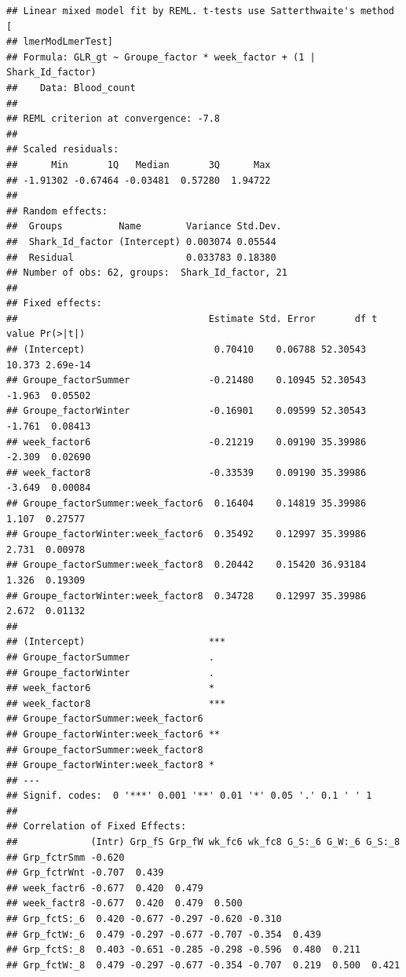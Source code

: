 \documentclass[
]{article}
\begin{document}
\begin{verbatim}
## Linear mixed model fit by REML. t-tests use Satterthwaite's method [
## lmerModLmerTest]
## Formula: GLR_gt ~ Groupe_factor * week_factor + (1 | Shark_Id_factor)
##    Data: Blood_count
## 
## REML criterion at convergence: -7.8
## 
## Scaled residuals: 
##      Min       1Q   Median       3Q      Max 
## -1.91302 -0.67464 -0.03481  0.57280  1.94722 
## 
## Random effects:
##  Groups          Name        Variance Std.Dev.
##  Shark_Id_factor (Intercept) 0.003074 0.05544 
##  Residual                    0.033783 0.18380 
## Number of obs: 62, groups:  Shark_Id_factor, 21
## 
## Fixed effects:
##                                  Estimate Std. Error       df t value Pr(>|t|)
## (Intercept)                       0.70410    0.06788 52.30543  10.373 2.69e-14
## Groupe_factorSummer              -0.21480    0.10945 52.30543  -1.963  0.05502
## Groupe_factorWinter              -0.16901    0.09599 52.30543  -1.761  0.08413
## week_factor6                     -0.21219    0.09190 35.39986  -2.309  0.02690
## week_factor8                     -0.33539    0.09190 35.39986  -3.649  0.00084
## Groupe_factorSummer:week_factor6  0.16404    0.14819 35.39986   1.107  0.27577
## Groupe_factorWinter:week_factor6  0.35492    0.12997 35.39986   2.731  0.00978
## Groupe_factorSummer:week_factor8  0.20442    0.15420 36.93184   1.326  0.19309
## Groupe_factorWinter:week_factor8  0.34728    0.12997 35.39986   2.672  0.01132
##                                     
## (Intercept)                      ***
## Groupe_factorSummer              .  
## Groupe_factorWinter              .  
## week_factor6                     *  
## week_factor8                     ***
## Groupe_factorSummer:week_factor6    
## Groupe_factorWinter:week_factor6 ** 
## Groupe_factorSummer:week_factor8    
## Groupe_factorWinter:week_factor8 *  
## ---
## Signif. codes:  0 '***' 0.001 '**' 0.01 '*' 0.05 '.' 0.1 ' ' 1
## 
## Correlation of Fixed Effects:
##             (Intr) Grp_fS Grp_fW wk_fc6 wk_fc8 G_S:_6 G_W:_6 G_S:_8
## Grp_fctrSmm -0.620                                                 
## Grp_fctrWnt -0.707  0.439                                          
## week_factr6 -0.677  0.420  0.479                                   
## week_factr8 -0.677  0.420  0.479  0.500                            
## Grp_fctS:_6  0.420 -0.677 -0.297 -0.620 -0.310                     
## Grp_fctW:_6  0.479 -0.297 -0.677 -0.707 -0.354  0.439              
## Grp_fctS:_8  0.403 -0.651 -0.285 -0.298 -0.596  0.480  0.211       
## Grp_fctW:_8  0.479 -0.297 -0.677 -0.354 -0.707  0.219  0.500  0.421
\end{verbatim}
\end{document}
